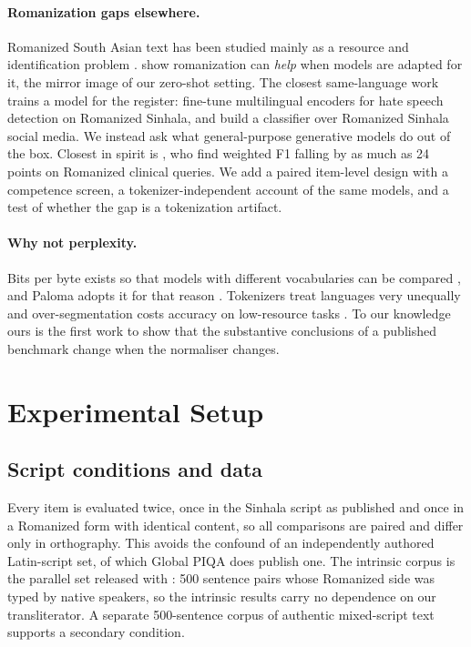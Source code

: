 \documentclass[11pt]{article}
\begin{document}
\paragraph{Romanization gaps elsewhere.}
Romanized South Asian text has been studied mainly as a resource and
identification problem \citep{roark-etal-2020-dakshina,
benton-etal-2025-improving}. \citet{j-etal-2024-romansetu} show romanization can
\emph{help} when models are adapted for it, the mirror image of our zero-shot
setting. The closest same-language work trains a model for the register:
\citet{chamikara-sumanathilaka-2026} fine-tune multilingual encoders for hate
speech detection on Romanized Sinhala, and
\citet{hewapathirana-sumanathilaka-2024-emoscan} build a classifier over
Romanized Sinhala social media. We instead ask what general-purpose generative
models do out of the box. Closest in spirit is
\citet{khullar-etal-2025-scriptgap}, who find weighted F1 falling by as much as
24 points on Romanized clinical queries. We add a paired item-level design with a
competence screen, a tokenizer-independent account of the same models, and a test
of whether the gap is a tokenization artifact.

\paragraph{Why not perplexity.}
Bits per byte exists so that models with different vocabularies can be compared
\citep{gao-etal-2020-pile}, and Paloma adopts it for that reason
\citep{magnusson-etal-2024-paloma}. Tokenizers treat languages very unequally
\citep{petrov-etal-2023-tokenizers, ahia-etal-2023-languages} and
over-segmentation costs accuracy on low-resource tasks
\citep{nag-etal-2024-fragmented}. To our knowledge ours is the first work to show
that the substantive conclusions of a published benchmark change when the
normaliser changes.

\section{Experimental Setup}
\label{sec:setup}

\subsection{Script conditions and data}

Every item is evaluated twice, once in the Sinhala script as published and once in a
Romanized form with identical content, so all comparisons are paired and differ only
in orthography. This avoids the confound of an independently authored Latin-script
set, of which Global PIQA does publish one. The intrinsic corpus is the parallel set
released with \citet{rajapakse-weerasinghe-2026-script}: 500 sentence pairs whose
Romanized side was typed by native speakers, so the intrinsic results carry no
dependence on our transliterator. A separate 500-sentence corpus of authentic
mixed-script text supports a secondary condition.
\end{document}
